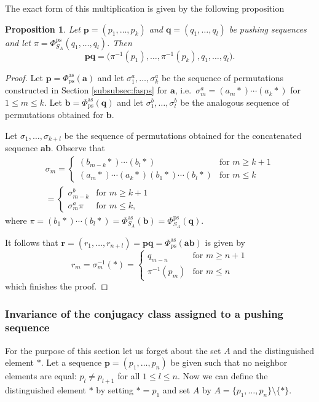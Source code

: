 \documentclass[12pt,dvips]{amsart}
\numberwithin{equation}{section} \numberwithin{figure}{section}
\theoremstyle{plain}
\newtheorem{proposition}[lemma]{Proposition}
\theoremstyle{definition}
\theoremstyle{remark}
\newcommand{\aaa}{{\mathbf{a}}}
\newcommand{\bbb}{{\mathbf{b}}}
\newcommand{\ppp}{{\mathbf{p}}}
\newcommand{\qqq}{{\mathbf{q}}}
\newcommand{\rrr}{{\mathbf{r}}}
\newcommand{\Sn}[1]{{{S}}_{#1}}
\newcommand{\xtra}{\ast}
\newcommand{\fasps}{\Phi^{\adm}_{\ps}}
\newcommand{\fassSym}{\Phi^{\adm}_{\Sn{A}}}
\newcommand{\fpssSym}{\Phi^{\ps}_{\Sn{A}}}
\DeclareMathOperator{\adm}{as}
\DeclareMathOperator{\ps}{ps}
\begin{document}
The exact form of this multiplication is given by the following
proposition
\begin{proposition}
\label{prop:mnozeniepushingsequences} Let $\ppp=(p_1,\dots,p_k)$ and
$\qqq=(q_1,\dots,q_l)$ be pushing sequences and let
$\pi=\fpssSym(q_1,\dots,q_l)$. Then
$$\ppp \qqq= \big(\pi^{-1}(p_1),\dots,\pi^{-1}(p_k),q_1,\dots,q_l \big). $$
\end{proposition}
\begin{proof}
Let $\ppp=\fasps(\aaa)$ and let $\sigma^a_1,\dots,\sigma^a_k$ be the
sequence of permutations constructed in Section
\ref{subsubsec:fasps} for $\aaa$, i.e.~$\sigma^a_m=(a_m
\xtra)\cdots(a_k\xtra)$ for $1\leq m\leq k$. Let $\bbb=\fasps(\qqq)$
and let $\sigma^b_1,\dots,\sigma^b_l$ be the analogous sequence of
permutations obtained for $\bbb$.

Let $\sigma_1,\dots,\sigma_{k+l}$ be the sequence of permutations
obtained for the concatenated sequence $\aaa \bbb$. Observe that
\begin{multline*}\sigma_m=\begin{cases}
(b_{m-k} \xtra) \cdots (b_l \xtra) & \text{for } m\geq k+1 \\
(a_{m} \xtra) \cdots (a_k \xtra) (b_1 \xtra) \cdots (b_l \xtra) &
\text{for } m\leq k \end{cases}  \\ =
\begin{cases} \sigma^b_{m-k}  & \text{for } m\geq k+1 \\
\sigma^a_{m} \pi & \text{for } m\leq k,
\end{cases}
\end{multline*}
where $\pi=(b_1 \xtra) \cdots (b_l
\xtra)=\fassSym(\bbb)=\fpssSym(\qqq)$.

It follows that $\rrr=(r_1,\dots,r_{n+l})= \ppp \qqq=\fasps(\aaa
\bbb)$ is given by
$$r_m=\sigma_m^{-1}(\xtra)=\begin{cases} q_{m-n} & \text{for } m\geq n+1 \\
\pi^{-1}(p_{m}) & \text{for } m\leq n
\end{cases} $$
which finishes the proof.
\end{proof}

\subsubsection{Invariance of the conjugacy class assigned to a pushing
sequence}
For the purpose of this section let us forget about the set $A$ and
the distinguished element $\xtra$. Let a sequence
$\ppp=(p_1,\dots,p_n)$ be given such that no neighbor elements are
equal: $p_l\neq p_{l+1}$ for all $1\leq l\leq n$. Now we can define
the distinguished element $\xtra$ by setting $\xtra=p_1$ and set $A$
by $A=\{p_1,\dots,p_n\}\setminus \{\xtra\}$.
\end{document}
